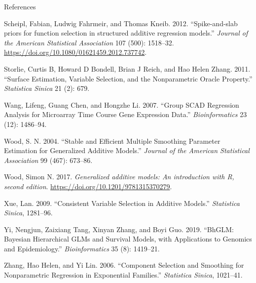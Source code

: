 \documentclass[
  ignorenonframetext,
  aspectratio=169]{beamer}
\newlength{\cslhangindent}
\newlength{\cslentryspacingunit} %
\newenvironment{CSLReferences}[2] %
 {%
  \setlength{\parindent}{0pt}
  \ifodd #1
  \let\oldpar\par
  \def\par{\hangindent=\cslhangindent\oldpar}
  \fi
  \setlength{\parskip}{#2\cslentryspacingunit}
 }%
 {}
\begin{document}
\begin{frame}[allowframebreaks]{References}
\begin{CSLReferences}{1}{0}
\leavevmode{}%
Scheipl, Fabian, Ludwig Fahrmeir, and Thomas Kneib. 2012.
{``{Spike-and-slab priors for function selection in structured additive
regression models}.''} \emph{Journal of the American Statistical
Association} 107 (500): 1518--32.
\url{https://doi.org/10.1080/01621459.2012.737742}.

\leavevmode{}%
Storlie, Curtis B, Howard D Bondell, Brian J Reich, and Hao Helen Zhang.
2011. {``Surface Estimation, Variable Selection, and the Nonparametric
Oracle Property.''} \emph{Statistica Sinica} 21 (2): 679.

\leavevmode{}%
Wang, Lifeng, Guang Chen, and Hongzhe Li. 2007. {``Group SCAD Regression
Analysis for Microarray Time Course Gene Expression Data.''}
\emph{Bioinformatics} 23 (12): 1486--94.

\leavevmode{}%
Wood, S. N. 2004. {``Stable and Efficient Multiple Smoothing Parameter
Estimation for Generalized Additive Models.''} \emph{Journal of the
American Statistical Association} 99 (467): 673--86.

\leavevmode{}%
Wood, Simon N. 2017. \emph{{Generalized additive models: An introduction
with R, second edition}}. \url{https://doi.org/10.1201/9781315370279}.

\leavevmode{}%
Xue, Lan. 2009. {``Consistent Variable Selection in Additive Models.''}
\emph{Statistica Sinica}, 1281--96.

\leavevmode{}%
Yi, Nengjun, Zaixiang Tang, Xinyan Zhang, and Boyi Guo. 2019. {``BhGLM:
Bayesian Hierarchical GLMs and Survival Models, with Applications to
Genomics and Epidemiology.''} \emph{Bioinformatics} 35 (8): 1419--21.

\leavevmode{}%
Zhang, Hao Helen, and Yi Lin. 2006. {``Component Selection and Smoothing
for Nonparametric Regression in Exponential Families.''}
\emph{Statistica Sinica}, 1021--41.

\end{CSLReferences}
\end{frame}
\end{document}
